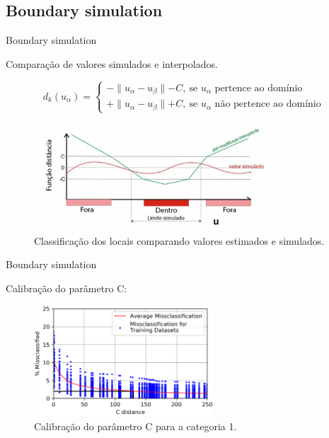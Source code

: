 \documentclass[aspectratio=169]{beamer}
\begin{document}
\subsection{Boundary simulation}

\begin{frame}{Boundary simulation}

Comparação de valores simulados e interpolados.

	\begin{equation}
	d_k(u_\alpha)=\begin{cases}
	-\parallel u_\alpha-u_\beta\parallel - C,\:\textrm{se $u_\alpha$ pertence ao domínio}\\
	+\parallel u_\alpha-u_\beta\parallel + C,\:\textrm{se $u_\alpha$ não pertence ao domínio}\end{cases}
	\label{C_dist}
	\end{equation}
	
	\begin{figure}[H]
		\caption{\label{class}Classificação dos locais comparando valores estimados e simulados.}
		\begin{center}
			\includegraphics[width=0.8\textwidth]{capitulo_2/classificacao.png}
		\end{center}
	\end{figure}
\end{frame}

\begin{frame}{Boundary simulation}

Calibração do parâmetro C:

	\begin{figure}[H]
		\caption{\label{c_param_1}Calibração do parâmetro C para a categoria 1.}
		\begin{center}
			\includegraphics[width=0.6\textwidth]{capitulo_2/uncert_1.png}
		\end{center}
	\end{figure}
\end{frame}
\end{document}
